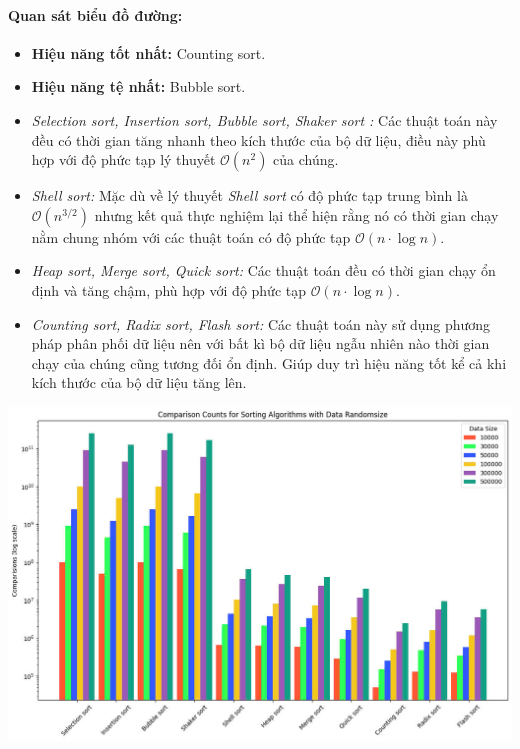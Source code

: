     \paragraph{Quan sát biểu đồ đường:}
    \begin{itemize}
        \item \textbf{Hiệu năng tốt nhất:} Counting sort.
        \item \textbf{Hiệu năng tệ nhất:} Bubble sort.
        \item \textit{Selection sort, Insertion sort, Bubble sort, Shaker sort :} Các thuật toán này đều có thời gian tăng nhanh theo kích thước của bộ dữ liệu, điều này phù hợp với độ phức tạp lý thuyết $\mathcal{O}(n^2)$ của chúng.
        \item \textit{Shell sort:} Mặc dù về lý thuyết \textit{Shell sort} có độ phức tạp trung bình là $\mathcal{O}(n^{3/2})$ nhưng kết quả thực nghiệm lại thể hiện rằng nó có thời gian chạy nằm chung nhóm với các thuật toán có độ phức tạp $\mathcal{O}(n \cdot \log n)$. 
        \item \textit{Heap sort, Merge sort, Quick sort:} Các thuật toán đều có thời gian chạy ổn định và tăng chậm, phù hợp với độ phức tạp $\mathcal{O}(n \cdot \log n)$.
        \item \textit{Counting sort, Radix sort, Flash sort:} Các thuật toán này sử dụng phương pháp phân phối dữ liệu nên với bất kì bộ dữ liệu ngẫu nhiên nào thời gian chạy của chúng cũng tương đối ổn định. Giúp duy trì hiệu năng tốt kể cả khi kích thước của bộ dữ liệu tăng lên.
    \end{itemize}

    \includegraphics[width = 1\linewidth]{img/experiment/comparison/comparision_randomesize.jpg}

